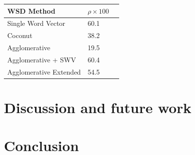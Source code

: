 \documentclass[11pt]{article}
\begin{document}
\begin{table}[H]
    \begin{tabular}{|l|l|l|}
    \hline
    WSD Method & $\rho \times 100$ \\ \hline
    Single Word Vector & 60.1 \\ \hline
    Coconut & 38.2 \\ \hline
    Agglomerative & 19.5 \\ \hline
    Agglomerative + SWV & 60.4 \\ \hline
    Agglomerative Extended & 54.5 \\ \hline
    \end{tabular}
\end{table}

\section{Discussion and future work}
\section{Conclusion}



\end{document}
